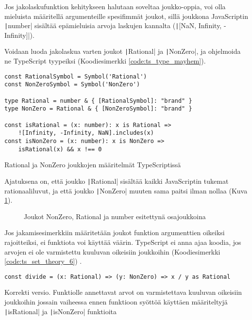 Jos jakolaskufunktion kehitykseen halutaan soveltaa joukko-oppia, voi olla mieluista määritellä argumenteille spesifimmät joukot, sillä joukkona JavaScriptin \texttt|number| sisältää epämieluisia arvoja laskujen kannalta (\texttt|[NaN, Infinity, -Infinity]|).

Voidaan luoda jakolaskua varten joukot \texttt|Rational| ja \texttt|NonZero|, ja ohjelmoida ne TypeScript tyypeiksi (Koodiesimerkki \ref{code:ts_type_mayhem}).

\begin{code}
    \begin{verbatim}
const RationalSymbol = Symbol('Rational')
const NonZeroSymbol = Symbol('NonZero')

type Rational = number & { [RationalSymbol]: "brand" }
type NonZero = Rational & { [NonZeroSymbol]: "brand" }

const isRational = (x: number): x is Rational => 
    ![Infinity, -Infinity, NaN].includes(x)
const isNonZero = (x: number): x is NonZero => 
    isRational(x) && x !== 0
\end{verbatim}
    \caption{Rational ja NonZero joukkojen määritelmät TypeScriptissä}
    \label{code:ts_type_mayhem}
\end{code}

Ajatuksena on, että joukko \texttt|Rational| sisältää kaikki JavaScriptin tukemat rationaaliluvut, ja että joukko \texttt|NonZero| muuten sama paitsi ilman nollaa (Kuva \ref{fig:set-esimerkki}).



\begin{figure}[ht]
    \centering
    \caption{Joukot NonZero, Rational ja number esitettynä osajoukkoina}
    \label{fig:set-esimerkki}
\end{figure}


Jos jakamisesimerkkiin määritetään joukot funktion argumenttien oikeiksi rajoitteiksi, ei funktiota voi käyttää väärin. TypeScript ei anna ajaa koodia, jos arvojen ei ole varmistettu kuuluvan oikeisiin joukkoihin (Koodiesimerkki \ref{code:ts_set_theory_6}) \cite{typsecript_website}.

\begin{code}
    \begin{verbatim}
const divide = (x: Rational) => (y: NonZero) => x / y as Rational
\end{verbatim}
    \caption{Korrekti versio. Funktiolle annettavat arvot on varmistettava kuuluvan oikeisiin joukkoihin jossain vaiheessa ennen funktioon syöttöä käyttäen määriteltyjä \texttt|isRational| ja \texttt|isNonZero| funktioita }
    \label{code:ts_set_theory_6}
\end{code}

